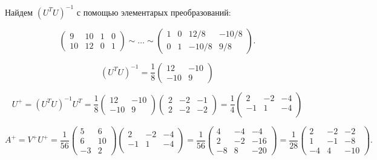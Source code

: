 \begin{example}
    Найдем $(U^TU)^{-1}$ с помощью элементарых преобразований:

    \begin{equation*}
        \left(\begin{array}{cc|cc}
            9 & 10 & 1 & 0 \\
            10 & 12 & 0 & 1
        \end{array}\right)
        \sim \ldots \sim
        \left(\begin{array}{cc|cc}
            1 & 0 & 12/8 & -10/8 \\
            0 & 1 & -10/8 & 9/8
        \end{array}\right)
    .\end{equation*}

    $$(U^TU)^{-1} = \frac{1}{8}\left(\begin{array}{cc}
        12 & -10 \\
        -10 & 9
    \end{array}\right)$$

    $$U^+ = (U^TU)^{-1}U^T = \frac{1}{8}\left(\begin{array}{cc}
        12 & -10 \\
        -10 & 9
    \end{array}\right)
    \left(\begin{array}{ccc}
        2 & -2 & -1 \\
        2 & -2 & -2
    \end{array}\right) = \frac{1}{4}\left(\begin{array}{ccc}
        2 & -2 & -4 \\
        -1 & 1 & -4 \\
    \end{array}\right)$$

    $$A^+ = V^+U^+ = \frac{1}{56}\left(\begin{array}{cc}
        5 & 6 \\
        6 & 10 \\
        -3 & 2
    \end{array}\right)
    \left(\begin{array}{ccc}
        2 & -2 & -4 \\
        -1 & 1 & -4 \\
    \end{array}\right)
    = \frac{1}{56}\left(\begin{array}{ccc}
        4 & -4 & -4 \\
        2 & -2 & -16 \\
        -8 & 8 & -20
    \end{array}\right)
    = \frac{1}{28}\left(\begin{array}{ccc}
        2 & -2 & -2 \\
        1 & -1 & -8 \\
        -4 & 4 & -10
    \end{array}\right).$$
\end{example}
